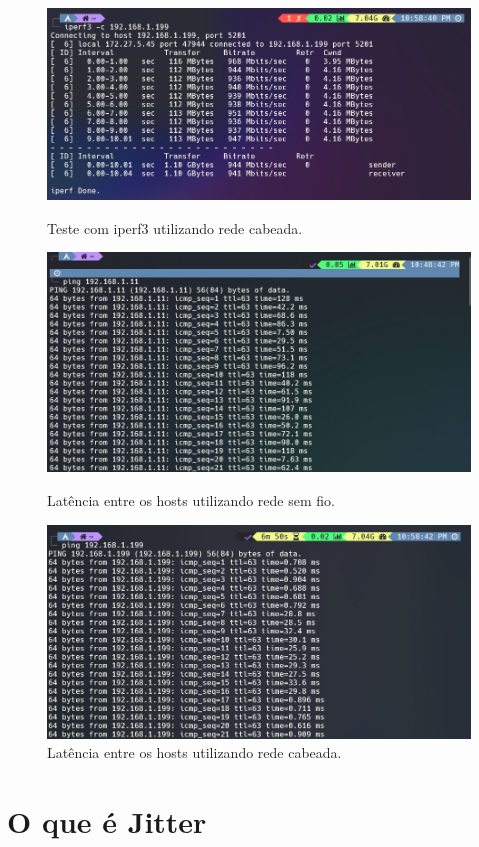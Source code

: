 \documentclass[a4paper,12pt]{article}
\begin{document}
\begin{figure}
  \includegraphics[width=1.0\textwidth]{img/iperf3-utp.png}
  \caption{Teste com iperf3 utilizando rede cabeada.}

  \centering
  \includegraphics[width=1.0\textwidth]{img/latencia-wifi.png}
  \caption{Latência entre os hosts utilizando rede sem fio.}

  \centering
  \includegraphics[width=1.0\textwidth]{img/latencia-cabo.png}
  \caption{Latência entre os hosts utilizando rede cabeada.}
\end{figure}
\break
\section*{O que é Jitter}
\end{document}
